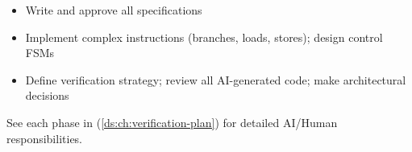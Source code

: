 \begin{record}

\begin{itemize}
\tightlist
\item
  Write and approve all specifications
\item
  Implement complex instructions (branches, loads, stores); design
  control FSMs
\item
  Define verification strategy; review all AI-generated code; make
  architectural decisions
\end{itemize}

See each phase in  (\cref{ds:ch:verification-plan}) for
detailed AI/Human responsibilities.

\end{record}
